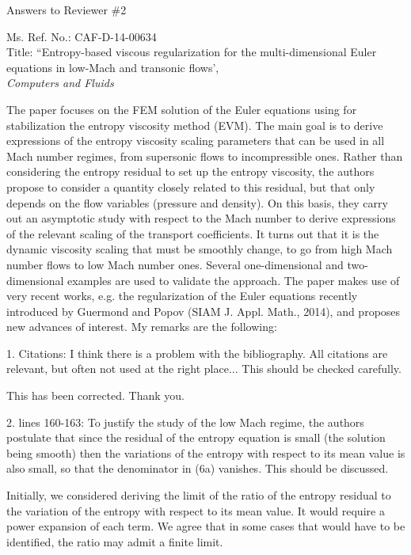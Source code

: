 \documentclass{article}
\begin{document}
\begin{center}
{ \Large Answers to Reviewer \#2}
\end{center}

\bigskip

\noindent Ms. Ref. No.: CAF-D-14-00634\\
Title: ``Entropy-based viscous regularization for the multi-dimensional Euler equations in low-Mach and transonic flows', \\
{\it Computers and Fluids}\\

\bigskip
\bigskip

{
\color{blue}
The paper focuses on the FEM solution of the Euler equations using for stabilization the entropy viscosity method (EVM). The main goal is to derive expressions of the entropy viscosity scaling parameters that can be used in all Mach number regimes, from supersonic flows to incompressible ones. Rather than considering the entropy residual to set up the entropy viscosity, the authors propose to consider a quantity closely related to this residual, but that only depends on the flow variables (pressure and density). On this basis, they carry out an asymptotic study with respect to the Mach number to derive expressions of the relevant scaling of the transport coefficients. It turns out that it is the dynamic viscosity scaling that must be smoothly change, to go  from high Mach number flows to low Mach number ones. Several one-dimensional and two-dimensional examples are used to validate the approach. The paper makes use of very recent works, e.g. the regularization
of the Euler equations recently introduced by Guermond and Popov  (SIAM J. Appl. Math., 2014), and proposes new advances of interest. My remarks are the following:
}

\bigskip

{
\color{blue}
1. Citations: I think there is a problem with the  bibliography. All citations are relevant, but often not used at the right place... This should be checked carefully.}

This has been corrected. Thank you.
\bigskip


{
\color{blue}
2. lines 160-163: To justify the study of the low Mach regime, the authors postulate that since the residual of the entropy equation is small (the solution being smooth) then the variations of the entropy with respect to its mean value is also small, so that the denominator in (6a) vanishes. This should be discussed.}

Initially, we considered deriving the limit of the ratio of the entropy residual to the variation of the entropy with respect to its mean value.  It would require a power expansion of each term. We agree that in some cases that would have to be identified, the ratio may admit a finite limit.
\end{document}
